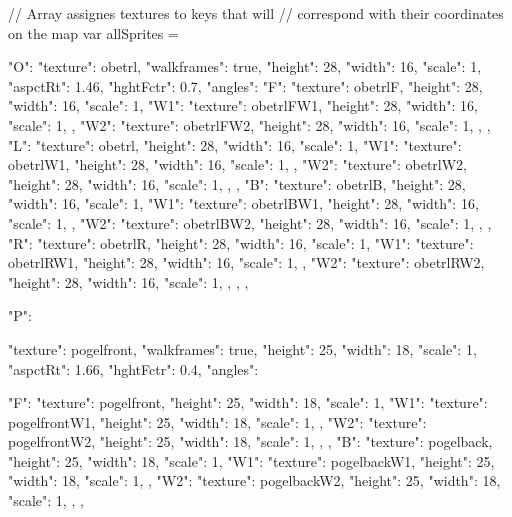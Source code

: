 // Array assignes textures to keys that will
// correspond with their coordinates on the map
var allSprites = {
  "O": {
    "texture": obetrl,
    "walkframes": true,
    "height": 28,
    "width": 16,
    "scale": 1,
    "aspctRt": 1.46,
    "hghtFctr": 0.7,
    "angles":{
      "F": {
        "texture": obetrlF,
        "height": 28,
        "width": 16,
        "scale": 1,
        "W1": {
          "texture": obetrlFW1,
          "height": 28,
          "width": 16,
          "scale": 1,
        },
        "W2": {
          "texture": obetrlFW2,
          "height": 28,
          "width": 16,
          "scale": 1,
        },
      },
      "L": {
        "texture": obetrl,
        "height": 28,
        "width": 16,
        "scale": 1,
        "W1": {
          "texture": obetrlW1,
          "height": 28,
          "width": 16,
          "scale": 1,
        },
        "W2": {
          "texture": obetrlW2,
          "height": 28,
          "width": 16,
          "scale": 1,
        },
      },
      "B": {
        "texture": obetrlB,
        "height": 28,
        "width": 16,
        "scale": 1,
        "W1": {
          "texture": obetrlBW1,
          "height": 28,
          "width": 16,
          "scale": 1,
        },
        "W2": {
          "texture": obetrlBW2,
          "height": 28,
          "width": 16,
          "scale": 1,
        },
      },
      "R": {
        "texture": obetrlR,
        "height": 28,
        "width": 16,
        "scale": 1,
        "W1": {
          "texture": obetrlRW1,
          "height": 28,
          "width": 16,
          "scale": 1,
        },
        "W2": {
          "texture": obetrlRW2,
          "height": 28,
          "width": 16,
          "scale": 1,
        },
      },
    }
  },


  "P": {
    "texture": pogelfront,
    "walkframes": true,
    "height": 25,
    "width": 18,
    "scale": 1,
    "aspctRt": 1.66,
    "hghtFctr": 0.4,
    "angles":{
      "F": {
        "texture": pogelfront,
        "height": 25,
        "width": 18,
        "scale": 1,
        "W1": {
          "texture": pogelfrontW1,
          "height": 25,
          "width": 18,
          "scale": 1,
        },
        "W2": {
          "texture": pogelfrontW2,
          "height": 25,
          "width": 18,
          "scale": 1,
        },
      },
      "B": {
        "texture": pogelback,
        "height": 25,
        "width": 18,
        "scale": 1,
        "W1": {
          "texture": pogelbackW1,
          "height": 25,
          "width": 18,
          "scale": 1,
        },
        "W2": {
          "texture": pogelbackW2,
          "height": 25,
          "width": 18,
          "scale": 1,
        },
      },

}}}
